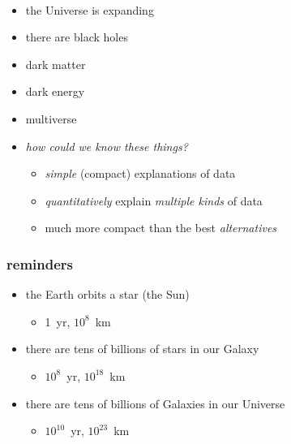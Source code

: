 \documentclass{beamer}
\begin{document}
\whiteonblack

{\begin{frame}[plain]~\end{frame}}

\begin{frame}
\begin{itemize}
\item the Universe is expanding
\item there are black holes
\item dark matter
\item dark energy
\item multiverse
\item \emph{how could we know these things?}
  \begin{itemize}
  \item \emph{simple} (compact) explanations of data
  \item \emph{quantitatively} explain \emph{multiple kinds} of data
  \item much more compact than the best \emph{alternatives}
  \end{itemize}
\end{itemize}
\end{frame}

\begin{frame}
  \frametitle{reminders}
  \begin{itemize}
  \item the Earth orbits a star (the Sun)
    \begin{itemize}
    \item 1~yr, $10^{8}$~km
    \end{itemize}
  \item there are tens of billions of stars in our Galaxy
    \begin{itemize}
    \item $10^8$~yr, $10^{18}$~km
    \end{itemize}
  \item there are tens of billions of Galaxies in our Universe
    \begin{itemize}
    \item $10^{10}$~yr, $10^{23}$~km
    \end{itemize}
  \end{itemize}
\end{frame}

{\begin{frame}[plain]~\end{frame}}
\end{document}
